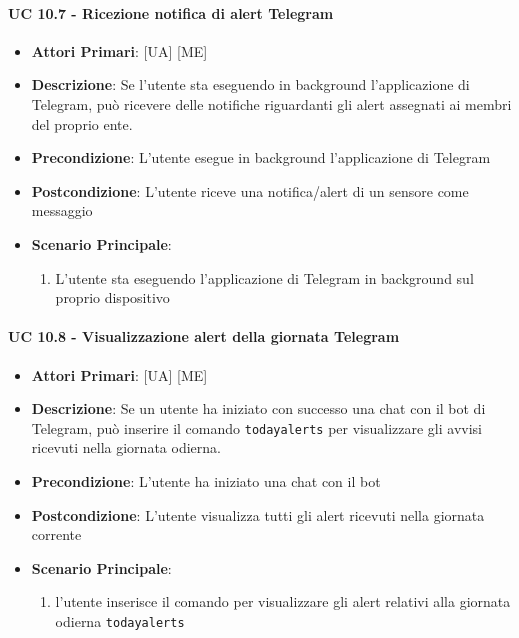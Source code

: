 			\paragraph{UC 10.7 - Ricezione notifica di alert Telegram}
			\begin{itemize}
				\item \textbf{Attori Primari}: [UA] [ME]
				\item \textbf{Descrizione}: Se l'utente sta eseguendo in background l'applicazione di Telegram, può ricevere delle notifiche riguardanti gli alert assegnati ai membri del proprio ente.
				\item \textbf{Precondizione}: L'utente esegue in background l'applicazione di Telegram
				\item \textbf{Postcondizione}: L'utente riceve una notifica/alert di un sensore come messaggio
				\item \textbf{Scenario Principale}:
				\begin{enumerate}
					\item{L'utente sta eseguendo l'applicazione di Telegram in background sul proprio dispositivo}
				\end{enumerate}	
			\end{itemize}

			\paragraph{UC 10.8 - Visualizzazione alert della giornata Telegram}
			\begin{itemize}
				\item \textbf{Attori Primari}: [UA] [ME]
				\item \textbf{Descrizione}: Se un utente ha iniziato con successo una chat con il bot di Telegram, può inserire il comando \verb!todayalerts! per visualizzare gli avvisi ricevuti nella giornata odierna.
				\item \textbf{Precondizione}: L'utente ha iniziato una chat con il bot
				\item \textbf{Postcondizione}: L'utente visualizza tutti gli alert ricevuti nella giornata corrente
				\item \textbf{Scenario Principale}:
				\begin{enumerate}
					\item{l'utente inserisce il comando per visualizzare gli alert relativi alla giornata odierna \verb!todayalerts!}
				\end{enumerate}	
			\end{itemize}

